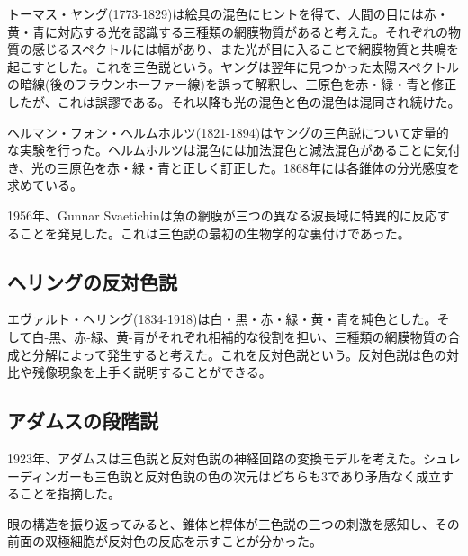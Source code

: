 		トーマス・ヤング(1773-1829)は絵具の混色にヒントを得て、人間の目には赤・黄・青に対応する光を認識する三種類の網膜物質があると考えた。それぞれの物質の感じるスペクトルには幅があり、また光が目に入ることで網膜物質と共鳴を起こすとした。これを三色説という。ヤングは翌年に見つかった太陽スペクトルの暗線(後のフラウンホーファー線)を誤って解釈し、三原色を赤・緑・青と修正したが、これは誤謬である。それ以降も光の混色と色の混色は混同され続けた。

		ヘルマン・フォン・ヘルムホルツ(1821-1894)はヤングの三色説について定量的な実験を行った。ヘルムホルツは混色には加法混色と減法混色があることに気付き、光の三原色を赤・緑・青と正しく訂正した。1868年には各錐体の分光感度を求めている。

		1956年、Gunnar Svaetichinは魚の網膜が三つの異なる波長域に特異的に反応することを発見した。これは三色説の最初の生物学的な裏付けであった。
	\subsection{へリングの反対色説}
		エヴァルト・へリング(1834-1918)は白・黒・赤・緑・黄・青を純色とした。そして白-黒、赤-緑、黄-青がそれぞれ相補的な役割を担い、三種類の網膜物質の合成と分解によって発生すると考えた。これを反対色説という。反対色説は色の対比や残像現象を上手く説明することができる。
	\subsection{アダムスの段階説}
		1923年、アダムスは三色説と反対色説の神経回路の変換モデルを考えた。シュレーディンガーも三色説と反対色説の色の次元はどちらも3であり矛盾なく成立することを指摘した。
		
		眼の構造を振り返ってみると、錐体と桿体が三色説の三つの刺激を感知し、その前面の双極細胞が反対色の反応を示すことが分かった。

